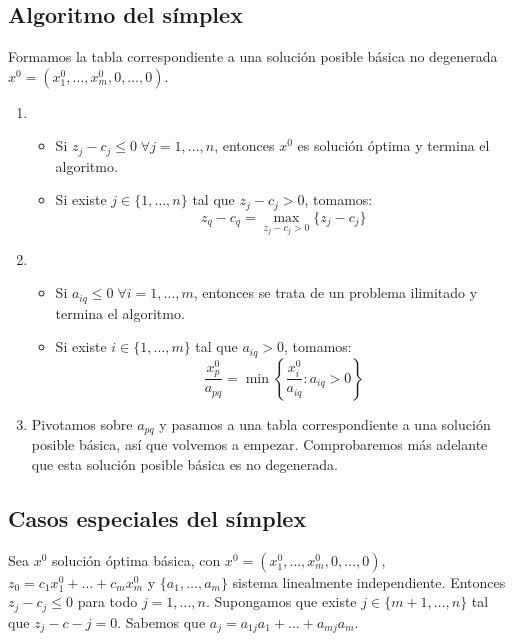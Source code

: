 \subsection*{Algoritmo del símplex}
Formamos la tabla correspondiente a una solución posible básica no degenerada $x^0 = (x^0_1, \dots, x^0_m, 0, \dots, 0)$.
\begin{enumerate}
    \item \begin{itemize}
              \item Si $z_j - c_j \leq 0 \; \forall j = 1, \dots, n$, entonces $x^0$ es solución óptima y termina el algoritmo.
              \item Si existe $j \in \{1, \dots, n\}$ tal que $z_j - c_j > 0$, tomamos:
                    $$z_q - c_q = \max_{z_j-c_j > 0}\{z_j-c_j\}$$
          \end{itemize}
    \item \begin{itemize}
              \item Si $a_{iq} \leq 0 \; \forall i = 1, \dots, m$, entonces se trata de un problema ilimitado y termina el algoritmo.
              \item Si existe $i \in \{1, \dots, m\}$ tal que $a_{iq} > 0$, tomamos:
                    $$\frac{x^0_p}{a_{pq}} = \min\left\{\frac{x^0_i}{a_{iq}} : a_{iq} > 0\right\}$$
          \end{itemize}
    \item Pivotamos sobre $a_{pq}$ y pasamos a una tabla correspondiente a una solución posible básica, así que volvemos a empezar.
          Comprobaremos más adelante que esta solución posible básica es no degenerada.
\end{enumerate}

\subsection*{Casos especiales del símplex}
Sea $x^0$ solución óptima básica, con $x^0 = (x^0_1, \dots, x^0_m, 0, \dots, 0)$, $z_0 = c_1x^0_1 + \dots + c_mx^0_m$ y $\{a_1, \dots, a_m\}$ sistema linealmente independiente.
Entonces $z_j - c_j \leq 0$ para todo $j = 1, \dots, n$.
Supongamos que existe $j \in \{m+1, \dots, n\}$ tal que $z_j-c-j = 0$.
Sabemos que $a_j = a_{1j}a_1 + \dots + a_{mj}a_m$.

